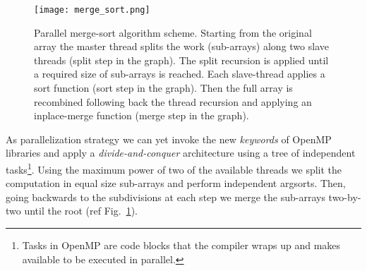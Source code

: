 \documentclass{standalone}
\begin{document}
\begin{figure}[htbp]
\centering
\texttt{[image: merge\_sort.png]}
\caption{Parallel merge-sort algorithm scheme.
Starting from the original array the master thread splits the work (sub-arrays) along two slave threads (\textsf{split} step in the graph).
The split recursion is applied until a required size of sub-arrays is reached.
Each slave-thread applies a sort function (\textsf{sort} step in the graph).
Then the full array is recombined following back the thread recursion and applying an \textsf{inplace-merge} function (\textsf{merge} step in the graph).
}
\label{fig:merge_sort}
\end{figure}

As parallelization strategy we can yet invoke the new \emph{keywords} of OpenMP libraries and apply a \emph{divide-and-conquer} architecture using a tree of independent \textsf{tasks}\footnote{
  Tasks in OpenMP are code blocks that the compiler wraps up and makes available to be executed in parallel.
}.
Using the maximum power of two of the available threads we split the computation in equal size sub-arrays and perform independent \textsf{argsort}s.
Then, going backwards to the subdivisions at each step we merge the sub-arrays two-by-two until the root (ref Fig.~\ref{fig:merge_sort}).
\end{document}

